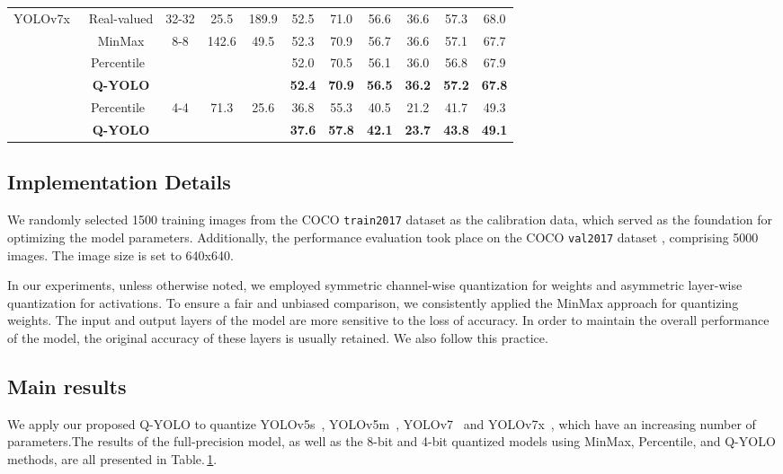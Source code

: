 \documentclass[runningheads]{llncs}
\begin{document}
\begin{table}[!t]
\begin{tabular}{ccccccccccc}
\multirow{6}{*}{YOLOv7x~\cite{wang2023yolov7}} & Real-valued & 32-32                & 25.5               & 189.9      & 52.5 & 71.0 & 56.6   & 36.6 & 57.3 & 68.0 \\ \cline{2-11} 
                         & MinMax      & \multirow{3}{*}{8-8} & \multirow{3}{*}{142.6} & \multirow{3}{*}{49.5} & 52.3 & 70.9   & 56.7 & 36.6 & 57.1 & 67.7 \\
                         & Percentile~\cite{li2019fully}  & & &                     & 52.0 & 70.5 & 56.1 & 36.0 & 56.8 & 67.9 \\
                         & \textbf{Q-YOLO}      & & &                      & \textbf{52.4} & \textbf{70.9} & \textbf{56.5} & \textbf{36.2}   & \textbf{57.2} & \textbf{67.8} \\ \cline{2-11} 
                         & Percentile~\cite{li2019fully}  & \multirow{2}{*}{4-4} & \multirow{2}{*}{71.3} & \multirow{2}{*}{25.6} & 36.8 & 55.3 & 40.5 & 21.2 & 41.7 & 49.3 \\
                         & \textbf{Q-YOLO}      & & &                      & \textbf{37.6} & \textbf{57.8}   & \textbf{42.1} & \textbf{23.7} & \textbf{43.8} & \textbf{49.1} \\ \hline
\end{tabular}
\label{exp_main}
\end{table}

\subsection{Implementation Details}
We randomly selected 1500 training images from the COCO {\tt train2017} dataset \cite{lin2014microsoft} as the calibration data, which served as the foundation for optimizing the model parameters. Additionally, the performance evaluation took place on the COCO {\tt val2017} dataset \cite{lin2014microsoft}, comprising 5000 images. The image size is set to 640x640. 

In our experiments, unless otherwise noted, we employed symmetric channel-wise quantization for weights and asymmetric layer-wise quantization for activations. To ensure a fair and unbiased comparison, we consistently applied the MinMax approach for quantizing weights. The input and output layers of the model are more sensitive to the loss of accuracy. In order to maintain the overall performance of the model, the original accuracy of these layers is usually retained. We also follow this practice.

\subsection{Main results}
We apply our proposed Q-YOLO to quantize YOLOv5s~\cite{yolov5}, YOLOv5m~\cite{yolov5}, YOLOv7~\cite{wang2023yolov7} and YOLOv7x~\cite{wang2023yolov7}, which have an increasing number of parameters.The results of the full-precision model, as well as the 8-bit and 4-bit quantized models using MinMax, Percentile, and Q-YOLO methods, are all presented in Table.\,\ref{exp_main}.
\end{document}
